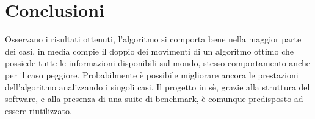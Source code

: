 \chapter*{Conclusioni}
Osservano i risultati ottenuti, l'algoritmo si comporta bene nella maggior parte dei casi, in media compie il doppio dei movimenti di un algoritmo ottimo che possiede tutte le informazioni disponibili sul mondo, stesso comportamento anche per il caso peggiore. Probabilmente è possibile migliorare ancora le prestazioni dell'algoritmo analizzando i singoli casi. Il progetto in sè, grazie alla struttura del software, e alla presenza di una suite di benchmark, è comunque predisposto ad essere riutilizzato.